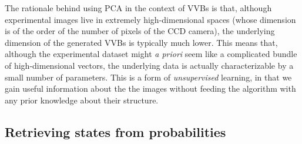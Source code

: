 The rationale behind using \ac{PCA} in the context of \acp{VVB} is that, although experimental images live in extremely high-dimensional spaces (whose dimension is of the order of the number of pixels of the \ac{CCD} camera), the underlying dimension of the generated \acp{VVB} is typically much lower.
This means that, although the experimental dataset might \emph{a priori} seem like a complicated bundle of high-dimensional vectors, the underlying data is actually characterizable by a small number of parameters.
This is a form of \emph{unsupervised} learning, in that we gain useful information about the the images without feeding the algorithm with any prior knowledge about their structure.




\subsection{Retrieving states from probabilities}

